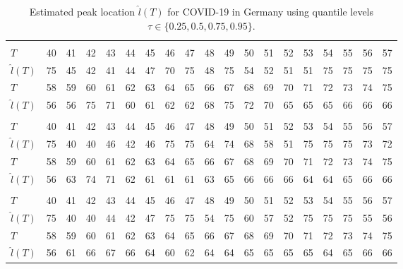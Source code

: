\documentclass[12pt,a4paper]{article}
\begin{document}
\begin{landscape}
	\begin{table}[htbp]
		\caption{Estimated peak location $\hat{l}(T)$ for COVID-19 in Germany using quantile levels $\tau\in\{0.25,0.5,0.75,0.95\}$.}
		\label{tab:germany_tau}
		\begin{tabular*}{\linewidth}{@{\extracolsep{\fill}}lrrrrrrrrrrrrrrrrrr}
			\toprule
			\addlinespace[2.5pt]
			\multicolumn{19}{c}{\textbf{$\tau=0.25,\ T_{\mathrm{stab}}=60,\ \varepsilon=15$}} \\
			\addlinespace[2.5pt]
			\midrule
			$T$ & 40 & 41 & 42 & 43 & 44 & 45 & 46 & 47 & 48 & 49 & 50 & 51 & 52 & 53 & 54 & 55 & 56 & 57 \\
			$\hat{l}(T)$ & 75 & 45 & 42 & 41 & 44 & 47 & 70 & 75 & 48 & 75 & 54 & 52 & 51 & 51 & 75 & 75 & 75 & 75 \\
			$T$ & 58 & 59 & 60 & 61 & 62 & 63 & 64 & 65 & 66 & 67 & 68 & 69 & 70 & 71 & 72 & 73 & 74 & 75 \\
			$\hat{l}(T)$ & 56 & 56 & 75 & 71 & 60 & 61 & 62 & 62 & 68 & 75 & 72 & 70 & 65 & 65 & 65 & 66 & 66 & 66 \\
			\midrule\addlinespace[2.5pt]
			\multicolumn{19}{c}{\textbf{$\tau=0.5,\ T_{\mathrm{stab}}=59,\ \varepsilon=15$}} \\
			\addlinespace[2.5pt]
			\midrule
			$T$ & 40 & 41 & 42 & 43 & 44 & 45 & 46 & 47 & 48 & 49 & 50 & 51 & 52 & 53 & 54 & 55 & 56 & 57 \\
			$\hat{l}(T)$ & 75 & 40 & 40 & 46 & 42 & 46 & 75 & 75 & 64 & 74 & 68 & 58 & 51 & 75 & 75 & 75 & 73 & 72 \\
			$T$ & 58 & 59 & 60 & 61 & 62 & 63 & 64 & 65 & 66 & 67 & 68 & 69 & 70 & 71 & 72 & 73 & 74 & 75 \\
			$\hat{l}(T)$ & 56 & 63 & 74 & 71 & 62 & 61 & 61 & 61 & 63 & 65 & 66 & 66 & 66 & 64 & 64 & 65 & 66 & 66 \\
			\midrule\addlinespace[2.5pt]
			\multicolumn{19}{c}{\textbf{$\tau=0.75,\ T_{\mathrm{stab}}=56,\ \varepsilon=15$}} \\
			\addlinespace[2.5pt]
			\midrule
			$T$ & 40 & 41 & 42 & 43 & 44 & 45 & 46 & 47 & 48 & 49 & 50 & 51 & 52 & 53 & 54 & 55 & 56 & 57 \\
			$\hat{l}(T)$ & 75 & 40 & 40 & 44 & 42 & 47 & 75 & 75 & 54 & 75 & 60 & 57 & 52 & 75 & 75 & 75 & 55 & 56 \\
			$T$ & 58 & 59 & 60 & 61 & 62 & 63 & 64 & 65 & 66 & 67 & 68 & 69 & 70 & 71 & 72 & 73 & 74 & 75 \\
			$\hat{l}(T)$ & 56 & 61 & 66 & 67 & 66 & 64 & 60 & 62 & 64 & 64 & 65 & 65 & 65 & 65 & 64 & 65 & 66 & 66 \\

\end{tabular*}
\end{table}
\end{landscape}
\end{document}
